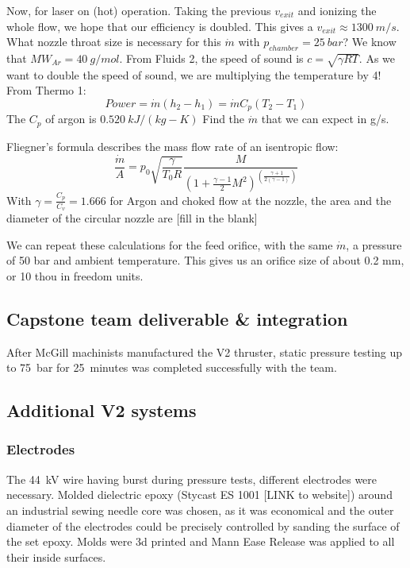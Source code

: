             Now, for laser on (hot) operation. Taking the previous $v_{exit}$ and ionizing the whole flow, we hope that our efficiency is doubled. This gives a $v_{exit}\approx 1300\:m/s$. What nozzle throat size is necessary for this $\dot m$ with $p_{chamber} = 25\: bar$? We know that $MW_{Ar} = 40 \: g/mol$. From Fluids 2, the speed of sound is $c = \sqrt{\gamma R T}$. As we want to double the speed of sound, we are multiplying the temperature by 4! From Thermo 1:
            \[Power = \dot m (h_2-h_1)
            = \dot m C_p (T_2-T_1)\]
            The $C_p$ of argon is $0.520\:kJ/(kg-K)$ Find the $\dot m$ that we can expect in g/s.\vspace{60mm}
            
            Fliegner's formula describes the mass flow rate of an isentropic flow:
            \[\frac{\dot m}{A} = p_0\sqrt{\frac{\gamma}{T_0 R}}\frac{M}{(1+\frac{\gamma-1}{2}M^2)^{(\frac{\gamma+1}{2(\gamma-1)})}}\]
            With $\gamma = \frac{C_p}{C_v} = 1.666$ for Argon and choked flow at the nozzle, the area and the diameter of the circular nozzle are [fill in the blank]
            
            We can repeat these calculations for the feed orifice, with the same $\dot m$, a pressure of 50 bar and ambient temperature. This gives us an orifice size of about 0.2 mm, or 10 thou in freedom units.

        \subsection{Capstone team deliverable \& integration}
            
            After McGill machinists manufactured the V2 thruster, static pressure testing up to \qty{75}{bar} for \qty{25}{minutes} was completed successfully with the team. 
        

        \subsection{Additional V2 systems}

            \subsubsection{Electrodes}
                The \qty{44}{kV} wire having burst during pressure tests, different electrodes were necessary. Molded dielectric epoxy (Stycast ES 1001 [LINK to website]) around an industrial sewing needle core was chosen, as it was economical and the outer diameter of the electrodes could be precisely controlled by sanding the surface of the set epoxy. Molds were 3d printed and Mann Ease Release was applied to all their inside surfaces.


